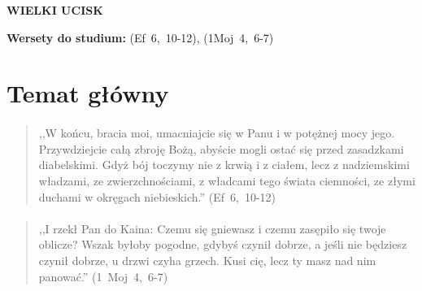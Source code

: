 \documentclass[10pt,a4paper,oneside]{article}
\begin{document}
\centerline{\textbf{\MakeUppercase{Wielki ucisk}}}
\begin{center}
\textbf{Wersety do studium:} 
\mbox{(Ef 6, 10-12)}, \mbox{(1Moj 4, 6-7)}
\end{center}
\section{Temat główny}
\paragraph{}
\begin{quote}
,,W końcu, bracia moi, umacniajcie się w Panu i w potężnej mocy jego. Przywdziejcie całą zbroję Bożą, abyście mogli ostać się przed zasadzkami diabelskimi. Gdyż bój toczymy nie z krwią i z ciałem, lecz z nadziemskimi władzami, ze zwierzchnościami, z władcami tego świata ciemności, ze złymi duchami w okręgach niebieskich.'' \mbox{(Ef 6, 10-12)}
\end{quote}
\paragraph{}
\begin{quote}
,,I rzekł Pan do Kaina: Czemu się gniewasz i czemu zasępiło się twoje oblicze? Wszak byłoby pogodne, gdybyś czynił dobrze, a jeśli nie będziesz czynił dobrze, u drzwi czyha grzech. Kusi cię, lecz ty masz nad nim panować.'' \mbox{(1 Moj 4, 6-7)}
\end{quote}
\end{document}
